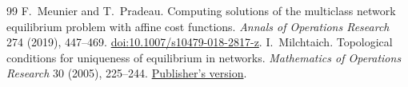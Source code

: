 \documentclass[11pt,oneside,openany,notitlepage]{report}
\begin{document}
\begin{thebibliography}{99}
F.~Meunier and T.~Pradeau. Computing solutions of the multiclass network
equilibrium problem with affine cost functions.
\emph{Annals of Operations Research} 274 (2019), 447--469.
\href{https://doi.org/10.1007/s10479-018-2817-z}{doi:10.1007/s10479-018-2817-z}.
I.~Milchtaich. Topological conditions for uniqueness of equilibrium in
networks. \emph{Mathematics of Operations Research} 30 (2005), 225--244.
\href{https://doi.org/10.1287/moor.1040.0122}{Publisher's version}.
\end{thebibliography}
\end{document}
